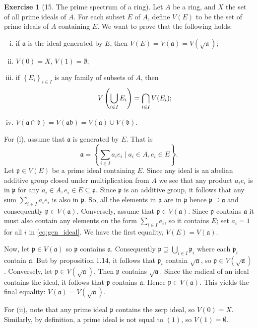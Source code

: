\documentclass{article}
\theoremstyle{definition}
\newtheorem*{exercise}{Exercise}
\begin{document}
\begin{exercise}[15. The prime spectrum of a ring]
	Let $A$ be a ring, and $X$ the set of all prime ideals of $A$. For
	each subset $E$ of $A$, define $V(E)$ to be the set of prime
	ideals of $A$ containing $E$. We want to prove that the following holds:
	\begin{enumerate}[(i)]
		\item if $\mathfrak{a}$ is the ideal generated by $E$,
			then $V(E) = V(\mathfrak{a}) =
			V(\sqrt{\mathfrak{a}})$;
		\item $V(0) = X$, $V(1) = \emptyset$;
		\item if $\left\{ E_i \right\}_{i \in I}$ is any family of
			subsets of $A$, then
			\begin{equation}
				\notag
				V\left(\bigcup_{i \in I} E_i\right) =
				\bigcap_{i \in I} V(E_i);
			\end{equation}
		\item $V(\mathfrak{a} \cap \mathfrak{b}) =
			V(\mathfrak{a}\mathfrak{b}) = V(\mathfrak{a})\cup
			V(\mathfrak{b})$.
	\end{enumerate}
	For (i), assume that $\mathfrak{a}$ is generated by $E$. That is
	\begin{equation}
		\label{eq:gen_ideal}
		\tag{*}
		\mathfrak{a} = \left\{ \sum_{i\in I} a_ie_i \mid a_i \in A, e_i \in E \right\}.
	\end{equation}
	Let $\mathfrak{p} \in V(E)$ be a prime ideal containing $E$. Since
	any ideal is an abelian additive group closed under multiplication
	from $A$ we see that any product $a_ie_i$ is in $\mathfrak{p}$ for
	any $a_i \in A, e_i \in E \subseteq \mathfrak{p}$. Since
	$\mathfrak{p}$ is an additive group, it follows that any sum $
	\sum^{}_{i \in I} a_i e_i$ is also in $\mathfrak{p}$. So, all the
	elements in $\mathfrak{a}$ are in $\mathfrak{p}$ hence
	$\mathfrak{p} \supseteq \mathfrak{a}$ and consequently
	$\mathfrak{p} \in V(\mathfrak{a})$. Conversely, assume that
	$\mathfrak{p} \in V(\mathfrak{a})$. Since $\mathfrak{p}$ contains
	$\mathfrak{a}$ it must also contain any elements on the form
	$\sum^{}_{i \in I} e_i$, so it contains $E$; set $a_i = 1$ for all
	$i$ in \cref{eq:gen_ideal}. We have the first equality, $V(E) =
	V(\mathfrak{a})$.

	Now, let $\mathfrak{p} \in V(\mathfrak{a})$ so $\mathfrak{p}$
	contains $\mathfrak{a}$. Consequently $\mathfrak{p} \supseteq
	\bigcup_{i \in I}\mathfrak{p}_i$ where each $\mathfrak{p}_i$
	contain $\mathfrak{a}$. But by proposition 1.14, it follows that
	$\mathfrak{p}_i$ contain $\sqrt{\mathfrak{a}}$, so $\mathfrak{p}
	\in V(\sqrt{\mathfrak{a}})$. Conversely, let $\mathfrak{p} \in
	V(\sqrt{\mathfrak{a}})$. Then $\mathfrak{p}$ contains
	$\sqrt{\mathfrak{a}}$. Since the radical of an ideal contains the
	ideal, it follows that $\mathfrak{p}$ contains $\mathfrak{a}$.
	Hence $\mathfrak{p} \in V(\mathfrak{a})$. This yields the final
	equality: $V(\mathfrak{a}) = V(\sqrt{\mathfrak{a}})$.
	
	For (ii), note that any prime ideal $\mathfrak{p}$ contains the
	zerp ideal, so $V(0) = X$. Similarly, by definition, a prime ideal
	is not equal to $(1)$, so $V(1) = \emptyset$.
\end{exercise}
\end{document}
